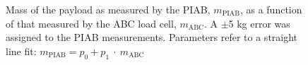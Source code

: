 \documentclass{cmspaper}
\begin{document}
\begin{figure}[hbtp]
  \begin{center}
    \caption{Mass of the payload as measured by the PIAB, $m_{\mathrm{PIAB}}$, as a function
    of that measured by the ABC load cell,
    $m_{\mathrm{ABC}}$. A $\pm$5 kg error was assigned to the PIAB
    measurements. Parameters refer to a straight line fit:
    $m_{\mathrm{PIAB}} =p_0 + p_1~\cdot~m_{\mathrm{ABC}}$}
    \label{fig:calib_line}
  \end{center}
\end{figure}
\end{document}
